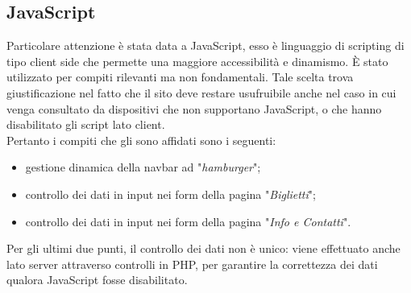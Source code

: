 \subsection{JavaScript}
Particolare attenzione è stata data a JavaScript, esso è linguaggio di scripting di tipo client side che permette una	maggiore accessibilità e dinamismo. È stato utilizzato per compiti rilevanti ma non fondamentali. Tale scelta trova giustificazione nel fatto che il sito deve restare usufruibile anche nel caso in cui venga consultato da dispositivi che non supportano JavaScript, o che hanno disabilitato gli script lato client.\\
Pertanto i compiti che gli sono affidati sono i seguenti:
\begin{itemize}
	\item gestione dinamica della navbar ad "\textit{hamburger}";
	\item controllo dei dati in input nei form della pagina "\textit{Biglietti}";
	\item controllo dei dati in input nei form della pagina "\textit{Info e Contatti}".
\end{itemize}
Per gli ultimi due punti, il controllo dei dati non è unico: viene effettuato anche lato server attraverso controlli in PHP, per garantire la correttezza dei dati qualora JavaScript fosse disabilitato.
